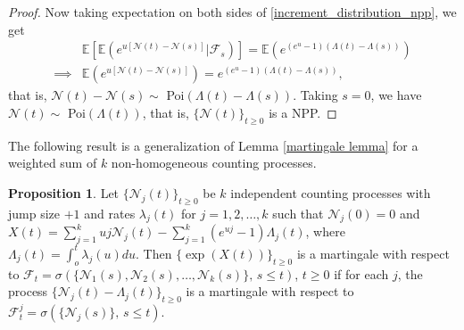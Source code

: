 \documentclass[11pt,oneside,reqno]{amsart}
\theoremstyle{definition}
\newtheorem{proposition}{Proposition}[section]
\theoremstyle{remarkstyle}
\begin{document}
\begin{proof}
Now taking expectation on both sides of \eqref{increment_distribution_npp}, we get
\begin{align}
    &\mathbb{E}\left[\mathbb{E}\left(e^{u[\mathcal{N}(t)-\mathcal{N}(s)]}\big|\mathcal{F}_s\right)\right]=\mathbb{E}\left(e^{(e^u-1)\left(\Lambda(t)-\Lambda(s)\right)}\right)\nonumber\\
    \implies&\mathbb{E}\left(e^{u[\mathcal{N}(t)-\mathcal{N}(s)]}\right)=e^{(e^u-1)\left(\Lambda(t)-\Lambda(s)\right)},\nonumber
\end{align}
that is, $\mathcal{N}(t)-\mathcal{N}(s)\sim$ Poi$\left(\Lambda(t)-\Lambda(s)\right)$. Taking $s=0$, we have $\mathcal{N}(t)\sim$ Poi$\left(\Lambda(t)\right)$, that is, $\{\mathcal{N}(t)\}_{t\ge 0}$ is a NPP.
\end{proof}

The following result is a generalization of Lemma \ref{martingale lemma} for a weighted sum of $k$ non-homogeneous counting processes.
\begin{proposition}\label{martingale_proposition}
    Let $\{\mathcal{N}_j(t)\}_{t\ge 0}$ be $k$ independent counting processes with jump size $+1$ and rates $\lambda_j(t)$ for $j=1,2,\dots,k$ such that $\mathcal{N}_j(0)=0$ and $X(t)=\sum_{j=1}^{k}uj\mathcal{N}_j(t)-\sum_{j=1}^{k}(e^{uj}-1)\Lambda_j(t)$, where $\Lambda_j(t)=\int_{o}^{t}\lambda_j(u)du$. Then $\{\exp\left(X(t)\right)\}_{t\ge 0}$ is a martingale with respect to $\mathcal{F}_t=\sigma(\{\mathcal{N}_1(s),\mathcal{N}_2(s),\dots,\mathcal{N}_k(s)\},\,s\le t)$, $t\ge 0$ if for each $j$, the process $\{\mathcal{N}_j(t)-\Lambda_j(t)\}_{t\ge 0}$ is a martingale with respect to $\mathcal{F}_t^j=\sigma(\{\mathcal{N}_j(s)\},\,s\le t)$.  
\end{proposition}
\end{document}
